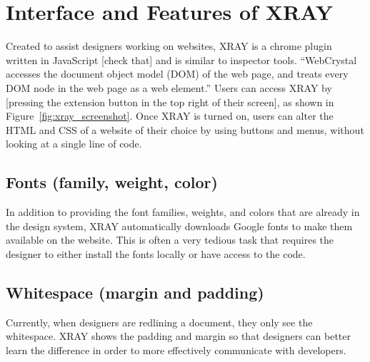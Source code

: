 \documentclass{sigchi}
\newcommand{\xray}{XRAY\xspace}
\begin{document}




\section{Interface and Features of XRAY}
Created to assist designers working on websites, \xray is a chrome plugin written in JavaScript [check that] and is similar to inspector tools. ``WebCrystal accesses the document object model (DOM) of the web page, and treats every DOM node in the web page as a web element.'' Users can access \xray by [pressing the extension button in the top right of their screen], as shown in Figure~\ref{fig:xray_screenshot}. Once \xray is turned on, users can alter the HTML and CSS of a website of their choice by using buttons and menus, without looking at a single line of code. 

\subsection{Fonts (family, weight, color)}
In addition to providing the font families, weights, and colors that are already in the design system, \xray 
automatically downloads Google fonts to make them available on the website. This is often a very tedious task that requires the designer to either install the fonts locally or have access to the code.

\subsection{Whitespace (margin and padding)}
Currently, when designers are redlining a document, they only see the whitespace. \xray shows the padding and margin so that designers can better learn the difference in order to more effectively communicate with developers. 
\end{document}
